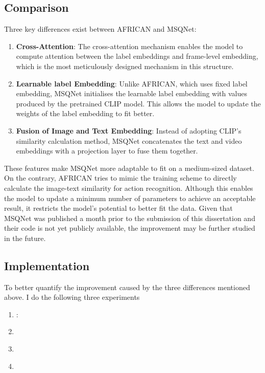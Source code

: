 \subsection{Comparison}
Three key differences exist between AFRICAN and MSQNet: 

\begin{enumerate}
    \item \textbf{Cross-Attention}: The cross-attention mechanism enables the model to compute attention between the label embeddings and frame-level embedding, which is the most meticulously designed mechanism in this structure.
    \item \textbf{Learnable label Embedding}: Unlike AFRICAN, which uses fixed label embedding, MSQNet initialises the learnable label embedding with values produced by the pretrained CLIP model. This allows the model to update the weights of the label embedding to fit better.
    \item \textbf{Fusion of Image and Text Embedding}: Instead of adopting CLIP's similarity calculation method, MSQNet concatenates the text and video embeddings with a projection layer to fuse them together. 
\end{enumerate}

These features make MSQNet more adaptable to fit on a medium-sized dataset. On the contrary, AFRICAN tries to mimic the training scheme to directly calculate the image-text similarity for action recognition. Although this enables the model to update a minimum number of parameters to achieve an acceptable result, it restricts the model's potential to better fit the data. Given that MSQNet was published a month prior to the submission of this dissertation and their code is not yet publicly available, the improvement may be further studied in the future.

\subsection{Implementation}
To better quantify the improvement caused by the three differences mentioned above. I do the following three experiments

\begin{enumerate}
    \item \textbf{}: 
    \item \textbf{}
    \item \textbf{}
    \item \textbf{}
\end{enumerate}




